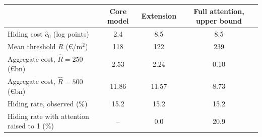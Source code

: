 \begin{tabular*}{\textwidth}{@{\extracolsep{\fill}}lccc@{}}
\toprule\toprule
 & \textbf{Core model} & \textbf{Extension} & \textbf{Full attention, upper bound} \\
\midrule
Hiding cost $\hat c_0$ (log points) & 2.4 & 8.5 & 8.5 \\
Mean threshold $\bar R$ (\euro/m$^2$) & 118 & 122 & 239 \\
Aggregate cost, $\hat R=250$ (\euro bn) & 2.53 & 2.24 & 0.10 \\
Aggregate cost, $\hat R=500$ (\euro bn) & 11.86 & 11.57 & 8.73 \\
Hiding rate, observed (\%) & 15.2 & 15.2 & 15.2 \\
Hiding rate with attention raised to 1 (\%) & -- & 0.0 & 20.9 \\
\bottomrule\bottomrule
\end{tabular*}
